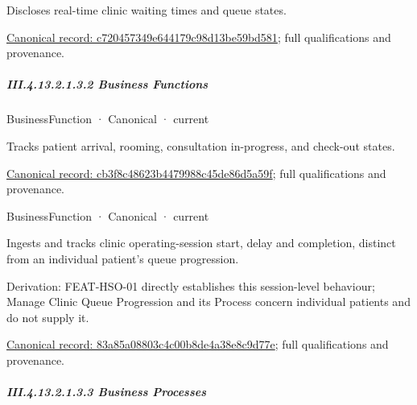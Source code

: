 Discloses real-time clinic waiting times and queue states.


{\footnotesize \href{../../../../continuum/business/business-service/c720457349e644179c98d13be59bd581.md}{Canonical record: c720457349e644179c98d13be59bd581}; full qualifications and provenance.}\par
\subparagraph*{III.4.13.2.1.3.2 Business Functions}
\label{navigation:III.4.13.2.1.3.2}

\label{navigation:III.4.13.2.1.3.2.1}

\label{element:cb3f8c48623b4479988c45de86d5a59f}
{\small BusinessFunction · Canonical · current}\par

Tracks patient arrival, rooming, consultation in-progress, and check-out states.


{\footnotesize \href{../../../../continuum/business/business-function/cb3f8c48623b4479988c45de86d5a59f.md}{Canonical record: cb3f8c48623b4479988c45de86d5a59f}; full qualifications and provenance.}\par
{}
\label{navigation:III.4.13.2.1.3.2.2}

\label{element:83a85a08803c4c00b8de4a38e8c9d77e}
{\small BusinessFunction · Canonical · current}\par

Ingests and tracks clinic operating-session start, delay and completion, distinct from an individual patient's queue progression.



Derivation: FEAT-HSO-01 directly establishes this session-level behaviour; Manage Clinic Queue Progression and its Process concern individual patients and do not supply it.


{\footnotesize \href{../../../../continuum/business/business-function/83a85a08803c4c00b8de4a38e8c9d77e.md}{Canonical record: 83a85a08803c4c00b8de4a38e8c9d77e}; full qualifications and provenance.}\par
\subparagraph*{III.4.13.2.1.3.3 Business Processes}
\label{navigation:III.4.13.2.1.3.3}

